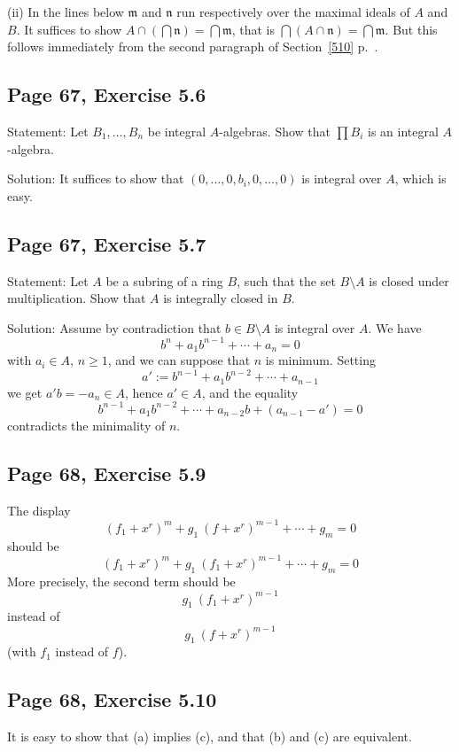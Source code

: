 \documentclass[parskip=half,fontsize=12pt]{scrartcl}%
\newcommand{\mf}{\mathfrak}
\newcommand{\mmm}{\mf m}
\newcommand{\nnn}{\mf n}
\begin{document}
(ii) In the lines below $\mmm$ and $\nnn$ run respectively over the maximal ideals of $A$ and $B$. It suffices to show $A\cap(\bigcap\nnn)=\bigcap\mmm$, that is $\bigcap(A\cap\nnn)=\bigcap\mmm$. But this follows immediately from the second paragraph of Section~\ref{510} p.~\pageref{510}. 

\subsection{Page 67, Exercise 5.6}%

Statement: Let $B_1,\ldots,B_n$ be integral $A$-algebras. Show that $\prod B_i$ is an integral $A$-algebra.

Solution: It suffices to show that $(0,\dots,0,b_i,0,\dots,0)$ is integral over $A$, which is easy. 

\subsection{Page 67, Exercise 5.7}%

Statement: Let $A$ be a subring of a ring $B$, such that the set $B\setminus A$ is closed under multiplication. Show that $A$ is integrally closed in $B$.

Solution: Assume by contradiction that $b\in B\setminus A$ is integral over $A$. We have 
$$
b^n+a_1b^{n-1}+\cdots+a_n=0
$$ 
with $a_i\in A$, $n\ge1$, and we can suppose that $n$ is minimum. Setting 
$$
a':=b^{n-1}+a_1b^{n-2}+\cdots+a_{n-1}
$$
we get $a'b=-a_n\in A$, hence $a'\in A$, and the equality 
$$
b^{n-1}+a_1b^{n-2}+\cdots+a_{n-2}b+(a_{n-1}-a')=0
$$ 
contradicts the minimality of $n$. 

\subsection{Page 68, Exercise 5.9}%

The display 
$$
(f_1+x^r)^m+g_1\ (f+x^r)^{m-1}+\cdots+g_m=0
$$ 
should be 
$$
(f_1+x^r)^m+g_1\ (f_1+x^r)^{m-1}+\cdots+g_m=0
$$ 
More precisely, the second term should be $$g_1\ (f_1+x^r)^{m-1}$$ instead of $$g_1\ (f+x^r)^{m-1}$$ (with $f_1$ instead of $f$).

\subsection{Page 68, Exercise 5.10}%

It is easy to show that (a) implies (c), and that (b) and (c) are equivalent.
\end{document}
